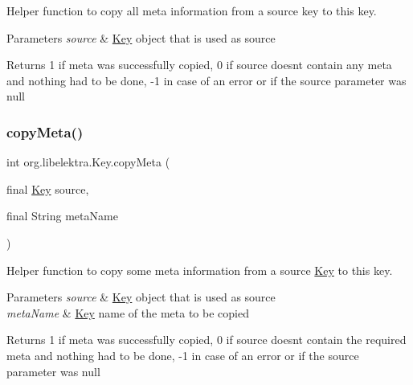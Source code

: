 Helper function to copy all meta information from a source key to this key. 


\begin{DoxyParams}{Parameters}
{\em source} & \hyperlink{classorg_1_1libelektra_1_1Key}{Key} object that is used as source \\
\hline
\end{DoxyParams}
\begin{DoxyReturn}{Returns}
1 if meta was successfully copied, 0 if source doesn\textquotesingle{}t contain any meta and nothing had to be done, -\/1 in case of an error or if the source parameter was null 
\end{DoxyReturn}
\mbox{\label{classorg_1_1libelektra_1_1Key_a421a4240ce01f2f196bdce7b3c1d02c2}} 
\subsubsection{\texorpdfstring{copy\+Meta()}{copyMeta()}}
{\footnotesize\ttfamily int org.\+libelektra.\+Key.\+copy\+Meta (\begin{DoxyParamCaption}\item[{final \hyperlink{classorg_1_1libelektra_1_1Key}{Key}}]{source,  }\item[{final String}]{meta\+Name }\end{DoxyParamCaption})\hspace{0.3cm}{\ttfamily [inline]}}



Helper function to copy some meta information from a source \hyperlink{classorg_1_1libelektra_1_1Key}{Key} to this key. 


\begin{DoxyParams}{Parameters}
{\em source} & \hyperlink{classorg_1_1libelektra_1_1Key}{Key} object that is used as source \\
\hline
{\em meta\+Name} & \hyperlink{classorg_1_1libelektra_1_1Key}{Key} name of the meta to be copied \\
\hline
\end{DoxyParams}
\begin{DoxyReturn}{Returns}
1 if meta was successfully copied, 0 if source doesn\textquotesingle{}t contain the required meta and nothing had to be done, -\/1 in case of an error or if the source parameter was null 
\end{DoxyReturn}
\mbox{\label{classorg_1_1libelektra_1_1Key_af407cf43625618af4e7fb2576037fcfc}} 
